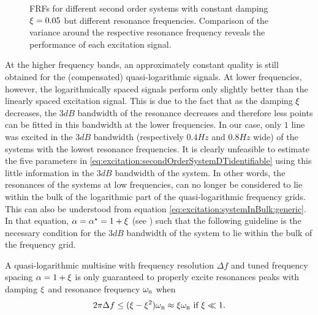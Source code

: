   \begin{figure}%
    \centering
      \setlength{}
      \setlength\figureheight{0.68\figurewidth}
    
    \caption[Simulated \glspl{FRF} and their variances of systems with $\damping=0.05$ for different excitation signals.]{\Glspl{FRF} for different second order systems with constant damping $\damping=0.05$ but different resonance frequencies. 
    Comparison of the variance around the respective resonance frequency reveals the performance of each excitation signal.}%
    \label{fig:excitation:damping005}
  \end{figure}

  At the higher frequency bands, an approximately constant quality is still obtained for the (compensated) quasi-logarithmic signals.
  At lower frequencies, however, the logarithmically spaced signals perform only slightly better than the linearly spaced excitation signal.
  This is due to the fact that as the damping $\xi_{}$ decreases, the $3\unit{dB}$ bandwidth of the resonance decreases and therefore less points can be fitted in this bandwidth at the lower frequencies.
  In our case, only $1$ line was excited in the $3 \unit{dB}$ bandwidth (respectively $0.4 \unit{Hz}$ and $0.8\unit{Hz}$ wide) of the systems with the lowest resonance frequencies.
  It is clearly unfeasible to estimate the five parameters in
  \eqref{eq:excitation:secondOrderSystemDTidentifiable} using this little information in the $3\unit{dB}$ bandwidth of the system.
  In other words, the resonances of the systems at low frequencies, can no longer be considered to lie within the bulk of the logarithmic part of the quasi-logarithmic frequency grids.
  This can also be understood from equation \eqref{eq:excitation:systemInBulk:generic}.
  In that equation, $\alpha = \alpha^{\star} = 1 + \xi_{}$ (see ) such that the following guideline is the necessary condition for the $3\unit{dB}$ bandwidth of the system to lie within the bulk of the frequency grid.

\begin{guideline}
\label{guide:excitation:systemInBulk:tuned}
 A quasi-logarithmic multisine with frequency resolution $\Delta f$ and tuned frequency spacing $\alpha=1+\xi_{}$ is only guaranteed to properly excite resonances peaks with damping $\xi_{}$ and resonance frequency $\omega_{\mathrm{n}}$ when 
  \begin{equation}
    2 \pi \Delta f \leq (\xi_{} - \xi_{}^2) \omega_{\mathrm{n}} 
    \approx \xi_{} \omega_{\mathrm{n}} \text{ if $\xi_{} \ll 1$}
    \text{.}
    \label{eq:excitation:systemInBulk:tuned}
  \end{equation}
  \end{guideline}

